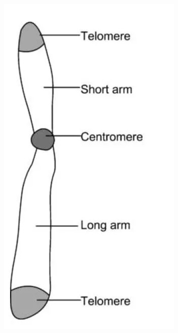 \documentclass{beamer}
\begin{document}
\begin{frame}
\begin{columns}
\begin{column}{0.33\textwidth}
			\centering	\includegraphics[keepaspectratio, width  = \textwidth]{img/chromosomeDiagram}\\ \pause
		\end{column}
		\begin{column}{0.33\textwidth}

\end{column}
\end{columns}
\end{frame}
\end{document}
